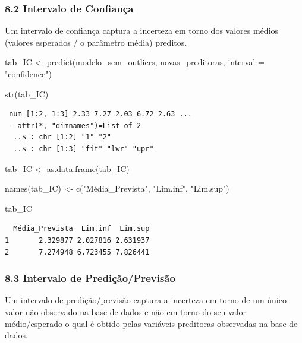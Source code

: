 \documentclass[
  letterpaper,
  DIV=11,
  numbers=noendperiod]{scrartcl}
\newenvironment{Shaded}{\begin{snugshade}}{\end{snugshade}}
\newcommand{\AttributeTok}[1]{\textcolor[rgb]{0.40,0.45,0.13}{#1}}
\newcommand{\FunctionTok}[1]{\textcolor[rgb]{0.28,0.35,0.67}{#1}}
\newcommand{\NormalTok}[1]{\textcolor[rgb]{0.00,0.23,0.31}{#1}}
\newcommand{\OtherTok}[1]{\textcolor[rgb]{0.00,0.23,0.31}{#1}}
\newcommand{\StringTok}[1]{\textcolor[rgb]{0.13,0.47,0.30}{#1}}
\begin{document}
\subsubsection{8.2 Intervalo de
Confiança}\label{intervalo-de-confianuxe7a}

Um intervalo de confiança captura a incerteza em torno dos valores
médios (valores esperados / o parâmetro média) preditos.

\begin{Shaded}
\begin{Highlighting}[]
\NormalTok{tab\_IC }\OtherTok{\textless{}{-}} \FunctionTok{predict}\NormalTok{(modelo\_sem\_outliers, novas\_preditoras,}
                  \AttributeTok{interval =} \StringTok{"confidence"}\NormalTok{)}

\FunctionTok{str}\NormalTok{(tab\_IC)}
\end{Highlighting}
\end{Shaded}

\begin{verbatim}
 num [1:2, 1:3] 2.33 7.27 2.03 6.72 2.63 ...
 - attr(*, "dimnames")=List of 2
  ..$ : chr [1:2] "1" "2"
  ..$ : chr [1:3] "fit" "lwr" "upr"
\end{verbatim}

\begin{Shaded}
\begin{Highlighting}[]
\NormalTok{tab\_IC }\OtherTok{\textless{}{-}} \FunctionTok{as.data.frame}\NormalTok{(tab\_IC)}

\FunctionTok{names}\NormalTok{(tab\_IC) }\OtherTok{\textless{}{-}} \FunctionTok{c}\NormalTok{(}\StringTok{"Média\_Prevista"}\NormalTok{,}
                   \StringTok{"Lim.inf"}\NormalTok{,}
                   \StringTok{"Lim.sup"}\NormalTok{)}

\NormalTok{tab\_IC}
\end{Highlighting}
\end{Shaded}

\begin{verbatim}
  Média_Prevista  Lim.inf  Lim.sup
1       2.329877 2.027816 2.631937
2       7.274948 6.723455 7.826441
\end{verbatim}

\subsubsection{8.3 Intervalo de
Predição/Previsão}\label{intervalo-de-prediuxe7uxe3oprevisuxe3o}

Um intervalo de predição/previsão captura a incerteza em torno de um
único valor não observado na base de dados e não em torno do seu valor
médio/esperado o qual é obtido pelas variáveis preditoras observadas na
base de dados.
\end{document}
